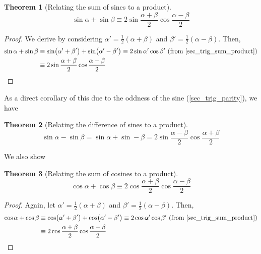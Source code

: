 \documentclass[fleqn,a4paper,11pt]{article}
\newtheorem{theorem}{Theorem}[section]
\begin{document}
    \begin{theorem}[Relating the sum of sines to a product]
    \begin{equation*}
    \sin \alpha + \sin \beta \equiv
        2 \sin \frac{\alpha + \beta}2 \cos \frac{\alpha - \beta}2
    \end{equation*}
    \end{theorem}
    \begin{proof}
    We derive by considering \(\alpha' = \frac 12 (\alpha + \beta)\) and
    \(\beta' = \frac 12 (\alpha - \beta)\). Then,
    \begin{align*}
    \sin \alpha + \sin \beta &\equiv
     \sin(\alpha' + \beta') + \sin(\alpha' - \beta') \equiv
     2\sin \alpha' \cos \beta'\ \text{(from \ref{sec_trig_sum_product})}
    \\&\equiv 2 \sin \frac{\alpha + \beta}2 \cos \frac{\alpha - \beta} 2
        \qedhere
    \end{align*}
    \end{proof}
    As a direct corollary of this due to the oddness of the sine
    (\ref{sec_trig_parity}), we have
    \begin{theorem}[Relating the difference of sines to a product]
    \begin{equation*}
    \sin \alpha - \sin \beta =
        \sin \alpha + \sin -\beta =
        2 \sin \frac{\alpha - \beta} 2 \cos\frac{\alpha + \beta} 2
    \end{equation*}
    \end{theorem}
    We also show
    \begin{theorem}[Relating the sum of cosines to a product]
    \begin{equation*}
    \cos \alpha + \cos \beta \equiv
        2 \cos\frac{\alpha + \beta} 2 \cos \frac{\alpha - \beta} 2
    \end{equation*}
    \end{theorem}
    \begin{proof}
    Again, let \(\alpha' = \frac 12 (\alpha + \beta)\) and
    \(\beta' = \frac 12 (\alpha - \beta)\). Then,
    \begin{align*}
     \cos \alpha + \cos \beta &\equiv
     \cos(\alpha' + \beta') + \cos(\alpha' - \beta') \equiv
     2\cos \alpha' \cos \beta'\ \text{(from \ref{sec_trig_sum_product})}
     \\&\equiv 2 \cos\frac{\alpha + \beta} 2 \cos \frac{\alpha - \beta} 2
        \qedhere
    \end{align*}
    \end{proof}
\end{document}
